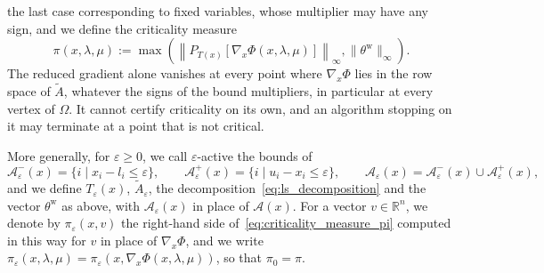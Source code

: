 \documentclass[pdflatex,sn-mathphys-num]{sn-jnl}%
\theoremstyle{thmstyleone}%
\newcommand{\RR}{{\mathbb{R}}} %
\newcommand{\calA}{{\mathcal{A}}}
\newcommand{\proj}[2]{P_{#1} \left[ {#2} \right]} %
\begin{document}
the last case corresponding to fixed variables, whose multiplier may have any sign, and we define the criticality measure
\begin{equation}\label{eq:criticality_measure_pi}
	\pi(x,\lambda,\mu) := \max\left( \left\|\proj{T(x)}{\nabla_x\Phi(x,\lambda,\mu)}\right\|_\infty, \|\theta^{\mathrm{w}}\|_\infty \right).
\end{equation}
The reduced gradient alone vanishes at every point where $\nabla_x\Phi$ lies in the row space of $\tilde{A}$, whatever the signs of the bound multipliers, in particular at every vertex of $\Omega$. It cannot certify criticality on its own, and an algorithm stopping on it may terminate at a point that is not critical.

More generally, for $\varepsilon \ge 0$, we call $\varepsilon$-active the bounds of
\[\calA^-_\varepsilon(x) = \{i \mid x_i - l_i \le \varepsilon\}, \qquad \calA^+_\varepsilon(x) = \{i \mid u_i - x_i \le \varepsilon\}, \qquad \calA_\varepsilon(x) = \calA^-_\varepsilon(x)\cup\calA^+_\varepsilon(x),\]
and we define $T_\varepsilon(x)$, $\tilde{A}_\varepsilon$, the decomposition~\eqref{eq:ls_decomposition} and the vector $\theta^{\mathrm{w}}$ as above, with $\calA_\varepsilon(x)$ in place of $\calA(x)$. For a vector $v \in \RR^n$, we denote by $\pi_\varepsilon(x,v)$ the right-hand side of~\eqref{eq:criticality_measure_pi} computed in this way for $v$ in place of $\nabla_x\Phi$, and we write $\pi_\varepsilon(x,\lambda,\mu) = \pi_\varepsilon(x,\nabla_x\Phi(x,\lambda,\mu))$, so that $\pi_0 = \pi$.
\end{document}
